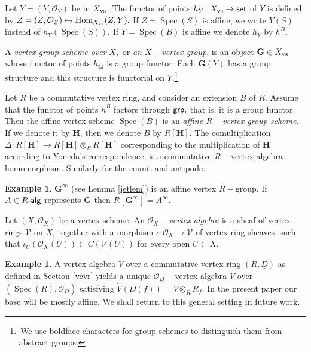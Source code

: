 \documentclass{article}
\theoremstyle{definition}
\newtheorem{ex}[thm]{Example}
\def\Spec{\ensuremath{\operatorname{Spec}}}
\def\grp{\ensuremath{\text{\textup{\textsf{grp}}}}}
\def\set{\ensuremath{\text{\textup{\textsf{set}}}}}
\def\Ralg{\ensuremath{R\text{-\textup{\textsf{alg}}}}}
\def\BG{\ensuremath{\mathbf{G}}}
\def\BH{\ensuremath{\mathbf{H}}}
\def\cO{\ensuremath{\mathcal{O}}}
\def\uD{\ensuremath{\underline{D}}}
\begin{document}
{ Let $Y = (Y, \cO_Y)$ be in $X_{\rm vs}$. The functor of points $h_Y \colon X_{\rm vs} \to \set$ of $Y$ is defined by $Z = (Z, \cO_Z) \mapsto {\rm Hom}_{X_{\rm vs}}(Z , Y).$ If $Z = \Spec(S)$ is affine, we write $Y(S)$ instead of $h_Y(\Spec(S)).$ If $Y = \Spec(B)$ is affine we denote $h_Y$ by $h^B.$ 
 
 A {\it vertex group scheme over} $X,$ or {\it an} $X-${\it vertex group}, is an object $\BG \in X_{\rm vs}$ whose functor of points $h_{\BG}$ is a group functor: Each $\BG(Y)$ has a group structure and this structure is functorial on $Y.$\footnote{\,We use boldface characters for group schemes to distinguish them from abstract groups.}   
 
 Let $R$ be a commutative vertex ring, and consider an  extension $B$ of $R.$ Assume that the functor of points $h^B$ factors through $\grp,$ that is, it is a group functor. Then the affine vertex scheme $\Spec(B)$ is an {\it affine $R-$vertex group scheme}. If we denote it by $\BH$, then we denote $B$ by $R[\BH].$ The comultiplication $\Delta \colon R[\BH] \to R[\BH] \otimes_R R[\BH]$ corresponding to the multiplication of $\BH$ according to Yoneda's correspondence, is a commutative $R-$vertex algebra homomorphism. Similarly for the counit and antipode.
 
  \begin{ex} $\BG^\infty$ (see Lemma \ref{jetlem}) is an affine vertex $R-$group. If $A \in \Ralg$ represents $\BG$ then $R[\BG^\infty] = A^\infty.$
\end{ex}
 
 
 
 
 
 Let  $(X, \mathcal O_X)$ be a vertex scheme. An\emph{ $\mathcal O_X-$vertex algebra} is a sheaf of vertex rings $\mathcal V$ on $X$, together with a morphism $\iota \colon \mathcal O_X \to \mathcal V$ of vertex ring sheaves, such that $\iota_U( \mathcal O_X(U)) \subset C(\mathcal V(U))$ for every open $U \subset X$.
 \begin{ex} \label{tildeV} A vertex algebra $V$ over a commutative vertex ring $(R, \uD)$ as defined in Section \ref{vcvr} yields a unique $\mathcal O_{\uD}-$vertex algebra $\widetilde{V}$ over $(\Spec (R), \cO_{\uD})$ satisfying $\widetilde{V}(D(f)) = V \otimes_R R_f.$   In the present paper our base will be mostly affine. We shall return to this general setting in future work. \end{ex}
  


}
\end{document}
